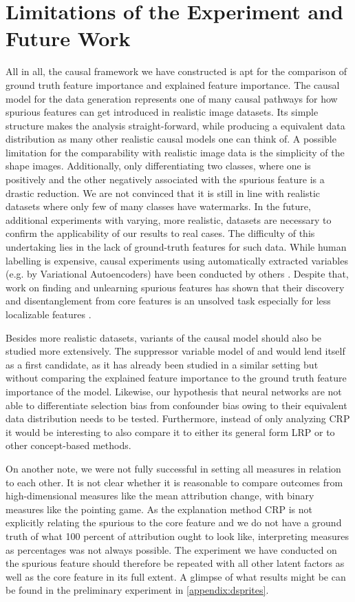 \section{Limitations of the Experiment and Future Work}
All in all, the causal framework we have constructed is apt for the comparison of ground truth feature importance and explained feature importance. The causal model for the data generation represents one of many causal pathways for how spurious features can get introduced in realistic image datasets. Its simple structure makes the analysis straight-forward, while producing a equivalent data distribution as many other realistic causal models one can think of.
A possible limitation for the comparability with realistic image data is the simplicity of the shape images. Additionally, only differentiating two classes, where one is positively and the other negatively associated with the spurious feature is a drastic reduction. We are not convinced that it is still in line with realistic datasets where only few of many classes have watermarks.
In the future, additional experiments with varying, more realistic, datasets are necessary to confirm the applicability of our results to real cases. The difficulty of this undertaking lies in the lack of ground-truth features for such data. While human labelling is expensive, causal experiments using automatically extracted variables (e.g. by Variational Autoencoders) have been conducted by others \citep{Reimers2020, Goyal2019, Tran2022}. Despite that, work on finding and unlearning spurious features has shown that their discovery and disentanglement from core features is an unsolved task especially for less localizable features \citep{Dreyer2023a}.

Besides more realistic datasets, variants of the causal model should also be studied more extensively. The suppressor variable model of \cite{Clark2023} and \cite{Wilming2022} would lend itself as a first candidate, as it has already been studied in a similar setting but without comparing the explained feature importance to the ground truth feature importance of the model. Likewise, our hypothesis that neural networks are not able to differentiate selection bias from confounder bias owing to their equivalent data distribution needs to be tested. 
Furthermore, instead of only analyzing CRP it would be interesting to also compare it to either its general form LRP or to other concept-based methods. 

On another note, we were not fully successful in setting all measures in relation to each other. It is not clear whether it is reasonable to compare outcomes from high-dimensional measures like the mean attribution change, with binary measures like the pointing game. As the explanation method CRP is not explicitly relating the spurious to the core feature and we do not have a ground truth of what 100 percent of attribution ought to look like, interpreting measures as percentages was not always possible. The experiment we have conducted on the spurious feature should therefore be repeated with all other latent factors as well as the core feature in its full extent. A glimpse of what results might be can be found in the preliminary experiment in \cref{appendix:dsprites}.


